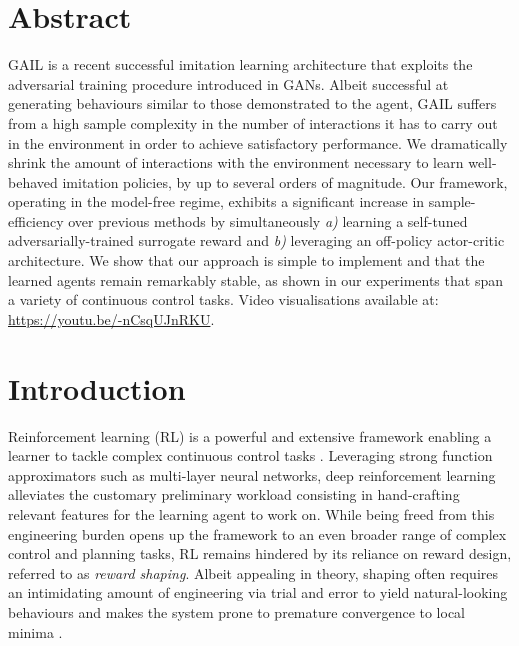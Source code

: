 

\section*{Abstract}

GAIL is a recent successful imitation learning architecture
that exploits the adversarial training procedure introduced in GANs.
Albeit successful at generating behaviours similar to those demonstrated
to the agent, GAIL suffers from a high sample complexity in the number of
interactions it has to carry out in the environment in order to achieve
satisfactory performance.
We dramatically shrink the amount of interactions with the
environment necessary to learn well-behaved imitation policies,
by up to several orders of magnitude.
Our framework, operating in the model-free regime,
exhibits a significant increase in sample-efficiency over previous methods
by simultaneously
\textit{a)} learning a self-tuned adversarially-trained surrogate reward and
\textit{b)} leveraging an off-policy actor-critic architecture.
We show that our approach is simple to implement
and that the learned agents remain remarkably stable,
as shown in our experiments that span a variety of continuous control tasks.
Video visualisations available at:
\url{https://youtu.be/-nCsqUJnRKU}.

\section{Introduction}

Reinforcement learning (RL) is a powerful and extensive framework enabling a
learner to tackle complex continuous control tasks \cite{Sutton1998-ow}.
Leveraging strong function approximators such as multi-layer neural networks,
deep reinforcement learning alleviates the customary preliminary workload
consisting in hand-crafting relevant features for the learning agent to work
on.
While being freed from this engineering burden opens up the framework to an
even broader range of complex control and planning tasks, RL remains hindered
by its reliance on reward design, referred to as
\textit{reward shaping}.
Albeit appealing in theory, shaping often requires an intimidating amount of
engineering via trial and error to yield natural-looking behaviours and makes
the system prone to premature convergence to local minima \cite{Ng1999-lv}.

